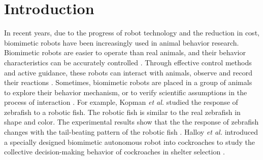 \section{Introduction}
In recent years, due to the progress of robot technology and the reduction in
cost, biomimetic robots have been increasingly used in animal behavior research.
Biomimetic robots are easier to operate than real animals, and their behavior
characteristics can be accurately controlled \cite{abdai_poking_the_futhre,
yeager_new_tech}. Through effective control methods and active guidance, these
robots can interact with animals, observe and record their reactions
\cite{son_entice_insect,Taylor2008frogs-17969,kopman_closed_loop_zebrafish,
partan_wild_tree,5650930}. Sometimes, biomimetic robots are placed in a group of
animals to explore their behavior mechanism, or to verify scientific assumptions
in the process of interaction \cite{doi:10.1126science.1144259,ward_quorum,
gribovskiy_mobile_robot,faria_novel_method}. For example, Kopman \textit{et al.}
studied the response of zebrafish to a robotic fish. The robotic fish is similar
to the real zebrafish in shape and color. The experimental results show that the
the response of zebrafish changes with the tail-beating pattern of the robotic
fish \cite{kopman_closed_loop_zebrafish}. Halloy \textit{et al.} introduced a
specially designed biomimetic autonomous robot into cockroaches to study the
collective decision-making behavior of cockroaches in shelter selection
\cite{doi:10.1126science.1144259}.

